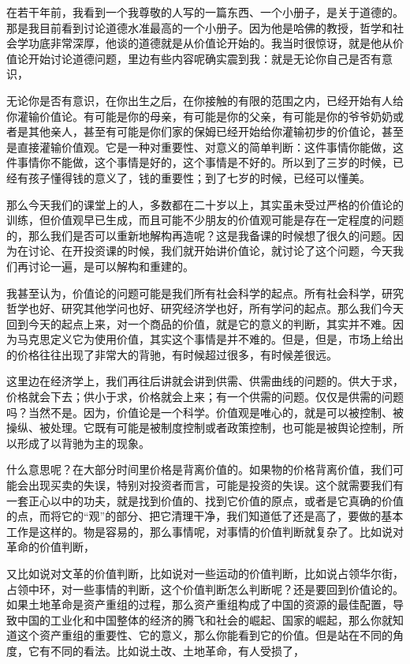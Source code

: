 \documentclass[UTF8, 12pt, a4paper]{ctexrep}
\begin{document}
在若干年前，我看到一个我尊敬的人写的一篇东西、一个小册子，是关于道德的。那是我目前看到讨论道德水准最高的一个小册子。因为他是哈佛的教授，哲学和社会学功底非常深厚，他谈的道德就是从价值论开始的。我当时很惊讶，就是他从价值论开始讨论道德问题，里边有些内容呢确实震到我：就是无论你自己是否有意识，

无论你是否有意识，在你出生之后，在你接触的有限的范围之内，已经开始有人给你灌输价值论。有可能是你的母亲，有可能是你的父亲，有可能是你的爷爷奶奶或者是其他亲人，甚至有可能是你们家的保姆已经开始给你灌输初步的价值论，甚至是直接灌输价值观。它是一种对重要性、对意义的简单判断：这件事情你能做，这件事情你不能做，这个事情是好的，这个事情是不好的。所以到了三岁的时候，已经有孩子懂得钱的意义了，钱的重要性；到了七岁的时候，已经可以懂美。

那么今天我们的课堂上的人，多数都在二十岁以上，其实虽未受过严格的价值论的训练，但价值观早已生成，而且可能不少朋友的价值观可能是存在一定程度的问题的，那么我们是否可以重新地解构再造呢？这是我备课的时候想了很久的问题。因为在讨论、在开投资课的时候，我们就开始讲价值论，就讨论了这个问题，今天我们再讨论一遍，是可以解构和重建的。

我甚至认为，价值论的问题可能是我们所有社会科学的起点。所有社会科学，研究哲学也好、研究其他学问也好、研究经济学也好，所有学问的起点。那么我们今天回到今天的起点上来，对一个商品的价值，就是它的意义的判断，其实并不难。因为马克思定义它为使用价值，其实这个事情是并不难的。但是，但是，市场上给出的价格往往出现了非常大的背驰，有时候超过很多，有时候差很远。

这里边在经济学上，我们再往后讲就会讲到供需、供需曲线的问题的。供大于求，价格就会下去；供小于求，价格就会上来；有一个供需的问题。仅仅是供需的问题吗？当然不是。因为，价值论是一个科学。价值观是唯心的，就是可以被控制、被操纵、被处理。它既有可能是被制度控制或者政策控制，也可能是被舆论控制，所以形成了以背驰为主的现象。

什么意思呢？在大部分时间里价格是背离价值的。如果物的价格背离价值，我们可能会出现买卖的失误，特别对投资者而言，可能是投资的失误。这个就需要我们有一套正心以中的功夫，就是找到价值的、找到它价值的原点，或者是它真确的价值的点，而将它的“观”的部分、把它清理干净，我们知道低了还是高了，要做的基本工作是这样的。物是容易的，那么事情呢，对事情的价值判断就复杂了。比如说对革命的价值判断，

又比如说对文革的价值判断，比如说对一些运动的价值判断，比如说占领华尔街，占领中环，对一些事情的判断，这个价值判断怎么判断呢？还是要回到价值论的。如果土地革命是资产重组的过程，那么资产重组构成了中国的资源的最佳配置，导致中国的工业化和中国整体的经济的腾飞和社会的崛起、国家的崛起，那么你就知道这个资产重组的重要性、它的意义，那么你能看到它的价值。但是站在不同的角度，它有不同的看法。比如说土改、土地革命，有人受损了，
\end{document}
